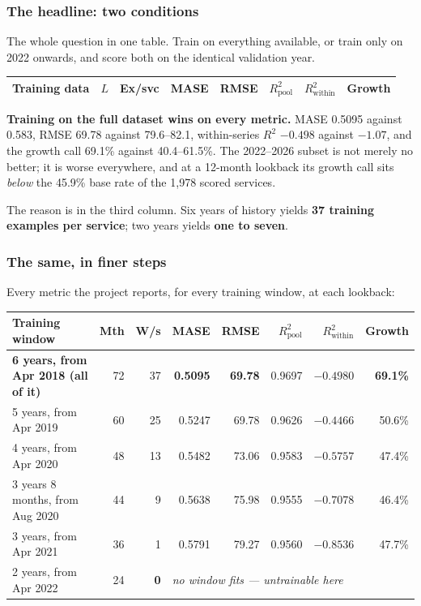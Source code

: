 \documentclass[11pt,a4paper]{article}
\newcommand{\keypoint}[1]{%
  \par\vspace{0.4em}%
  \noindent\colorbox{fed!8}{\parbox{0.98\textwidth}{\vspace{0.2em}#1\vspace{0.2em}}}%
  \par\vspace{0.4em}}
\begin{document}
\subsubsection*{The headline: two conditions}

The whole question in one table. Train on everything available, or train only on 2022 onwards, and
score both on the identical validation year.

\begin{center}
\footnotesize
\begin{tabular}{@{}lrrrrrrr@{}}
\toprule
\textbf{Training data} & \textbf{$L$} & \textbf{Ex/svc} & \textbf{MASE} & \textbf{RMSE} & \textbf{$R^2_{\text{pool}}$} & \textbf{$R^2_{\text{within}}$} & \textbf{Growth} \\
\midrule
\bottomrule
\end{tabular}
\end{center}

\keypoint{\textbf{Training on the full dataset wins on every metric.} MASE 0.5095 against 0.583, RMSE
69.78 against 79.6--82.1, within-series $R^2$ $-0.498$ against $-1.07$, and the growth call 69.1\%
against 40.4--61.5\%. The 2022--2026 subset is not merely no better; it is worse everywhere, and at a
12-month lookback its growth call sits \emph{below} the 45.9\% base rate of the 1{,}978 scored
services.

The reason is in the third column. Six years of history yields \textbf{37 training examples per
service}; two years yields \textbf{one to seven}.}

\subsubsection*{The same, in finer steps}

Every metric the project reports, for every training window, at each lookback:

\begin{center}
\footnotesize
\begin{tabular}{@{}lrrrrrrr@{}}
\toprule
\textbf{Training window} & \textbf{Mth} & \textbf{W/s} & \textbf{MASE} & \textbf{RMSE} & \textbf{$R^2_{\text{pool}}$} & \textbf{$R^2_{\text{within}}$} & \textbf{Growth} \\
\midrule
\textbf{6 years, from Apr 2018 (all of it)} & 72 & 37 & \textbf{0.5095} & \textbf{69.78} & 0.9697 & $-0.4980$ & \textbf{69.1\%} \\
5 years, from Apr 2019 & 60 & 25 & 0.5247 & 69.78 & 0.9626 & $-0.4466$ & 50.6\% \\
4 years, from Apr 2020 & 48 & 13 & 0.5482 & 73.06 & 0.9583 & $-0.5757$ & 47.4\% \\
3 years 8 months, from Aug 2020 & 44 & 9 & 0.5638 & 75.98 & 0.9555 & $-0.7078$ & 46.4\% \\
3 years, from Apr 2021 & 36 & 1 & 0.5791 & 79.27 & 0.9560 & $-0.8536$ & 47.7\% \\
2 years, from Apr 2022 & 24 & \textbf{0} & \multicolumn{5}{l}{\textit{no window fits --- untrainable here}} \\
\bottomrule
\end{tabular}
\end{center}
\end{document}
